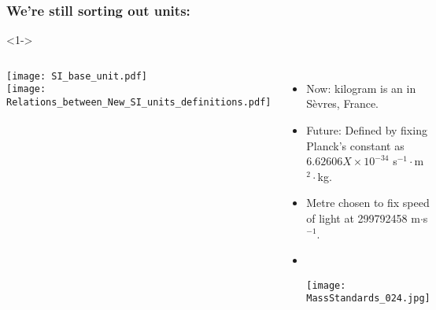 \begin{frame}
  \frametitle{We're still sorting out units:}

  \begin{block}<1->{}
    \begin{columns}
      \texttt{[image: SI\_base\_unit.pdf]}\\
      \texttt{[image: Relations\_between\_New\_SI\_units\_definitions.pdf]}\\
      \begin{itemize}
      \item<2->
        Now: kilogram is an 
        in S\`{e}vres, France.
      \item<3->
        Future: 
        Defined by fixing Planck's constant 
        as $6.62606X \times 10^{−34}$
        s$^{-1}\cdot$m$^{2}\cdot$kg.\footnotemark[3]
      \item<5->
        Metre chosen to fix speed of light at 299792458 m$\cdot$s$^{-1}$.        
      \item<6->
        \\
        \medskip
        \begin{center}
          \texttt{[image: MassStandards\_024.jpg]}  
        \end{center}
      \end{itemize}
    \end{columns}

  \end{block}


\end{frame}


